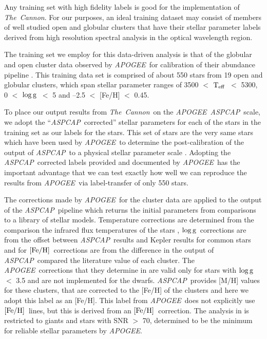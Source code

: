 \documentclass[12pt, preprint]{aastex}
\newcommand{\teff}{\mbox{$\rm T_{eff}$}}
\newcommand{\feh}{\mbox{$\rm [Fe/H]$}}
\newcommand{\logg}{\mbox{$\rm \log g$}}
\newcommand{\tc}{\textsl{The~Cannon}}
\newcommand{\apogee}{\textsl{APOGEE}}
\newcommand{\aspcap}{\textsl{ASPCAP}}
\begin{document}
Any training set with high fidelity labels is good for the implementation of \tc. For our purposes, an ideal training dataset may consist of members of
well studied open and globular clusters that have their stellar
parameter labels derived from high resolution spectral analysis in the
optical wavelength region.


The training set we employ for this data-driven analysis is that of the globular and open cluster data observed by \apogee\ for calibration of their abundance pipeline \citep{Meszaros2013}. This training data set is comprised of about 550 stars from 19 open and globular clusters, which span stellar parameter ranges of 3500 $<$ \teff\ $<$ 5300, 0 $<$ \logg\ $<$ 5 and --2.5 $<$ [Fe/H] $<$ 0.45. 


To place our output results from \tc\ on the \apogee\ \aspcap\ scale, we adopt the ``\aspcap\ corrected'' stellar parameters for each of the stars in the training set as our labels for the stars. This set of stars are the very same stars which have been used by \apogee\ to determine the post-calibration of the output of \aspcap\ to a physical stellar parameter scale \citep{Meszaros2013}. Adopting the \aspcap\ corrected labels provided and documented by \apogee\  has the important advantage that we can test exactly how well we can reproduce the results from \apogee\ via label-transfer of only 550 stars.

The corrections made by \apogee\ for the cluster data are applied to the output of the \aspcap\ pipeline which returns the initial parameters from comparisons to a library of stellar models. Temperature corrections are determined from the comparison the infrared flux temperatures of the stars \citep{Gonzalez2009}, \logg\ corrections are from the offset between \aspcap\ results and Kepler results for common stars and for \feh\ corrections are from the difference in the output of \aspcap\ compared the literature value of each cluster.  The \apogee\ corrections that they determine in \citet{Meszaros2013} are valid only for stars with \logg\ $<$ 3.5 and are not implemented for the dwarfs. \aspcap\ provides [M/H] values for these clusters, that are corrected to the [Fe/H] of the clusters and here we adopt this label as an [Fe/H]. This label from \apogee\ does not explicitly use \feh\ lines, but this is derived from an \feh\ correction. The analysis in \citet{Meszaros2013} is restricted to giants and stars with SNR $>$ 70, determined to be the minimum for reliable stellar parameters by \apogee.
\end{document}
